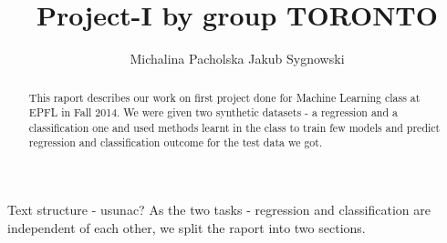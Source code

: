 \documentclass{article}
\title{Project-I by group TORONTO}
\author{Michalina Pacholska \And Jakub Sygnowski}
\begin{document}
\maketitle
\begin{abstract}
    This raport describes our work on first project done for Machine Learning class at EPFL in Fall 2014. We were given two synthetic datasets - a regression and a classification one and used methods learnt in the class to train few models and predict regression and classification outcome for the test data we got. 
\end{abstract}
\begin{section}{Text structure - usunac?}
As the two tasks - regression and classification are independent of each other, we split the raport into two sections.
\end{section}
\end{document}
